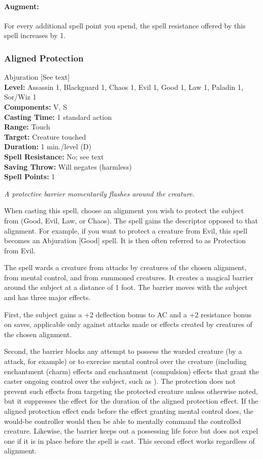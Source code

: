 \paragraph{Augment:} For every additional spell point you spend, the spell resistance offered by this spell increases by 1.
\subsubsection{Aligned Protection}
\label{Spell:AlignedProtection}
Abjuration [See text]
\\ \textbf{Level:} Assassin 1, Blackguard 1, Chaos 1, Evil 1, Good 1, Law 1, Paladin 1, Sor/Wiz 1
\\ \textbf{Components:} V, S
\\ \textbf{Casting Time:} 1 standard action
\\ \textbf{Range:} Touch
\\ \textbf{Target:} Creature touched
\\ \textbf{Duration:} 1 min./level (D)
\\ \textbf{Spell Resistance:} No; see text
\\ \textbf{Saving Throw:} Will negates (harmless)
\\ \textbf{Spell Points:} 1

\emph{A protective barrier momentarily flashes around the creature.}

When casting this spell, choose an alignment you wish to protect the subject from (Good, Evil, Law, or Chaos).
The spell gains the descriptor opposed to that alignment. For example, if you want to protect a creature from Evil, this spell becomes an Abjuration [Good] spell.
It is then often referred to as Protection from Evil.

The spell wards a creature from attacks by creatures of the chosen alignment, from mental control, and from summoned creatures. 
It creates a magical barrier around the subject at a distance of 1 foot. The barrier moves with the subject and has three major effects.

First, the subject gains a +2 deflection bonus to AC and a +2 resistance bonus on saves,
applicable only against attacks made or effects created by creatures of the chosen alignment.

Second, the barrier blocks any attempt to possess the warded creature (by a  attack, for example) or to exercise mental control over the creature (including enchantment (charm) effects and enchantment (compulsion) effects that grant the caster ongoing control over the subject, such as ). 
The protection does not prevent such effects from targeting the protected creature unless otherwise noted, but it suppresses the effect for the duration of the aligned protection effect. 
If the aligned protection effect ends before the effect granting mental control does, the would-be controller would then be able to mentally command the controlled creature. 
Likewise, the barrier keeps out a possessing life force but does not expel one if it is in place before the spell is cast. 
This second effect works regardless of alignment.

